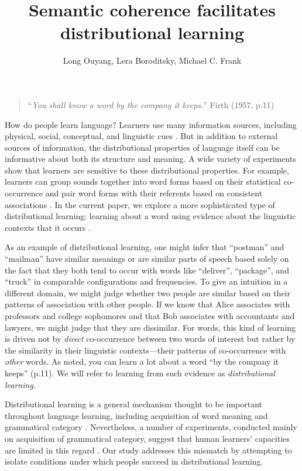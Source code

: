 \documentclass[man,floatsintext]{apa6}
\title{Semantic coherence facilitates distributional learning}
\author{Long Ouyang, Lera Boroditsky, Michael C. Frank}
\affiliation{Department of Psychology, Stanford University\vskip 5em Word count: 8,312}
\begin{document}
\maketitle

\begin{quote}
``\emph{You shall know a word by the company it keeps.}'' Firth (1957, p.11)
\end{quote}

How do people learn language? Learners use many information sources, including physical, social, conceptual, and linguistic cues \citep{clark1988, markman1991, gleitman1990, baldwin1993, hollich2000}. But in addition to external sources of information, the distributional properties of language itself can be informative about both its structure and meaning. A wide variety of experiments show that learners are sensitive to these distributional properties. For example, learners can group sounds together into word forms based on their statistical co-occurrence \citep{saffran1996a, saffran1996b} and pair word forms with their referents based on consistent associations \citep{yu2007,smith2008}. In the current paper, we explore a more sophisticated type of distributional learning: learning about a word using evidence about the linguistic contexts that it occurs \citep{smith1966, maratsos1980, braine1987, redington1998}.

As an example of distributional learning, one might infer that ``postman'' and ``mailman'' have similar meanings or are similar parts of speech based solely on the fact that they both tend to occur with words like ``deliver'', ``package'', and ``truck'' in comparable configurations and frequencies. To give an intuition in a different domain, we might judge whether two people are similar based on their patterns of association with other people. If we know that Alice associates with professors and college sophomores and that Bob associates with accountants and lawyers, we might judge that they are dissimilar. For words, this kind of learning is driven not by \emph{direct} co-occurrence between two words of interest but rather by the similarity in their linguistic contexts---their patterns of co-occurrence with \emph{other} words. As \citet{firth1957} noted, you can learn a lot about a word ``by the company it keeps'' (p.11). We will refer to learning from such evidence as \emph{distributional learning}.

Distributional learning is a general mechanism thought to be important throughout language learning, including acquisition of word meaning \citep{landauer1997} and grammatical category \citep{redington1998}. Nevertheless, a number of experiments, conducted mainly on acquisition of grammatical category, suggest that human learners' capacities are limited in this regard \citep{braine1987, brooks1993, frigo1998, kempe2001, gerken2005, frank2011}. Our study addresses this mismatch by attempting to isolate conditions under which people succeed in distributional learning.
\end{document}
